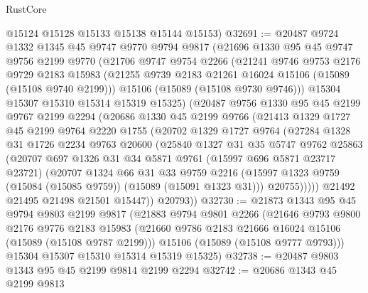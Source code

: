\begin{lexlean}{RustCore}
\begin{coremodule}
      @15124
      @15128
      @15133
      @15138
      @15144
      @15153)
@32691 := @20487
    @9724
    @1332
    @1345
    @45
    @9747
    @9770
    @9794
    @9817
    (@21696
      @1330
      @95
      @45
      @9747
      @9756
      @2199
      @9770
      (@21706
        @9747
        @9754
        @2266
        (@21241
          @9746
          @9753
          @2176
          @9729
          @2183
          @15983
          (@21255 @9739 @2183 @21261 @16024 @15106 (@15089 (@15108 @9740 @2199)))
          @15106
          (@15089 (@15108 @9730 @9746)))
        @15304
        @15307
        @15310
        @15314
        @15319
        @15325)
      (@20487
        @9756
        @1330
        @95
        @45
        @2199
        @9767
        @2199
        @2294
        (@20686
          @1330
          @45
          @2199
          @9766
          (@21413
            @1329
            @1727
            @45
            @2199
            @9764
            @2220
            @1755
            (@20702
              @1329
              @1727
              @9764
              (@27284
                @1328
                @31
                @1726
                @2234
                @9763
                @20600
                (@25840
                  @1327
                  @31
                  @35
                  @5747
                  @9762
                  @25863
                  (@20707
                    @697
                    @1326
                    @31
                    @34
                    @5871
                    @9761
                    (@15997 @696 @5871 @23717 @23721)
                    (@20707
                      @1324
                      @66
                      @31
                      @33
                      @9759
                      @2216
                      (@15997 @1323 @9759 (@15084 (@15085 @9759)) (@15089 (@15091 @1323 @31)))
                      @20755)))))
            @21492
            @21495
            @21498
            @21501
            @15447))
        @20793))
@32730 := @21873
    @1343
    @95
    @45
    @9794
    @9803
    @2199
    @9817
    (@21883
      @9794
      @9801
      @2266
      (@21646
        @9793
        @9800
        @2176
        @9776
        @2183
        @15983
        (@21660 @9786 @2183 @21666 @16024 @15106 (@15089 (@15108 @9787 @2199)))
        @15106
        (@15089 (@15108 @9777 @9793)))
      @15304
      @15307
      @15310
      @15314
      @15319
      @15325)
@32738 := @20487 @9803 @1343 @95 @45 @2199 @9814 @2199 @2294
@32742 := @20686 @1343 @45 @2199 @9813

\end{coremodule}
\end{lexlean}
